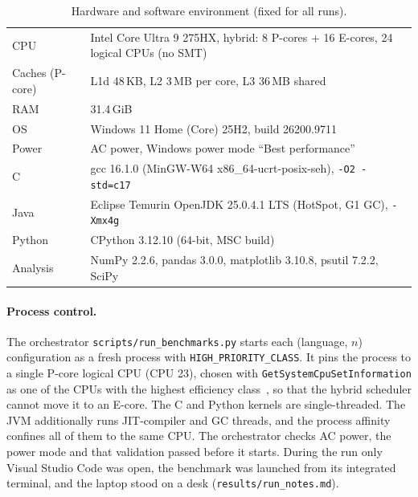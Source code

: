 \documentclass[11pt,a4paper]{article}
\begin{document}
\begin{table}[htbp]
  \centering\small
  \caption{Hardware and software environment (fixed for all runs).}
  \label{tab:env}
  \begin{tabularx}{\linewidth}{lX}
    \toprule
    CPU & Intel Core Ultra 9 275HX, hybrid: 8 P-cores + 16 E-cores, 24 logical CPUs (no SMT) \\
    Caches (P-core) & L1d 48\,KB, L2 3\,MB per core, L3 36\,MB shared \\
    RAM & 31.4\,GiB \\
    OS & Windows 11 Home (Core) 25H2, build 26200.9711 \\
    Power & AC power, Windows power mode ``Best performance'' \\
    C & gcc 16.1.0 (MinGW-W64 x86\_64-ucrt-posix-seh), \texttt{-O2 -std=c17} \\
    Java & Eclipse Temurin OpenJDK 25.0.4.1 LTS (HotSpot, G1 GC), \texttt{-Xmx4g} \\
    Python & CPython 3.12.10 (64-bit, MSC build) \\
    Analysis & NumPy 2.2.6, pandas 3.0.0, matplotlib 3.10.8, psutil 7.2.2, SciPy \\
    \bottomrule
  \end{tabularx}
\end{table}

\paragraph{Process control.} The orchestrator \texttt{scripts/run\_benchmarks.py} starts each
(language, $n$) configuration as a fresh process with \texttt{HIGH\_PRIORITY\_CLASS}. It pins the process
to a single P-core logical CPU (CPU 23), chosen with \texttt{GetSystemCpuSetInformation} as one of the
CPUs with the highest efficiency class~\cite{ms_cpuset}, so that the hybrid scheduler cannot move it to
an E-core. The C and Python kernels are single-threaded. The JVM additionally runs JIT-compiler
and GC threads, and the process affinity confines all of them to the same CPU. The orchestrator
checks AC power, the power mode and that validation passed before it starts. During the run only
Visual Studio Code was open, the benchmark was launched from its integrated terminal, and the laptop
stood on a desk (\texttt{results/run\_notes.md}).
\end{document}
